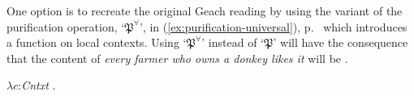 
\label{pg:donkey-purification-universal}
One option is to recreate the original Geach reading by
using the variant of the purification operation, `$\mathfrak{P}^\forall$', in
(\ref{ex:purification-universal}), p.~\pageref{ex:purification-universal} which introduces a function on local contexts.
Using `$\mathfrak{P}^\forall$' instead of `$\mathfrak{P}$' will have the
consequence that the content of \textit{every farmer who owns a donkey
  likes it} will be \nexteg{}.
\begin{ex} 
  $\lambda c$:\textit{Cntxt} . 
\end{ex} 

